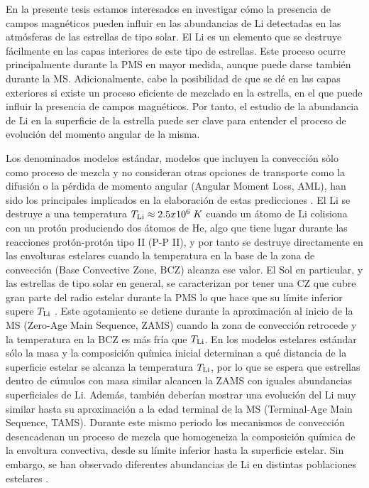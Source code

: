 En la presente tesis estamos interesados en investigar cómo la presencia de campos magnéticos pueden influir en las abundancias de Li detectadas en las atmósferas de las estrellas de tipo solar. El Li es un elemento que se destruye fácilmente en las capas interiores de este tipo de estrellas. Este proceso ocurre principalmente durante la PMS en mayor medida, aunque puede darse también durante la MS. Adicionalmente, cabe la posibilidad de que se dé en las capas exteriores si existe un proceso eficiente de mezclado en la estrella, en el que puede influir la presencia de campos magnéticos. Por tanto, el estudio de la abundancia de Li en la superficie de la estrella puede ser clave para entender el proceso de evolución del momento angular de la misma.\par


Los denominados modelos estándar, modelos que incluyen la convección sólo como proceso de mezcla y no consideran otras opciones de transporte como la difusión o la pérdida de momento angular (Angular Moment Loss, AML), han sido los principales implicados en la elaboración de estas predicciones \cite{Sestito2005}. El Li se destruye a una temperatura $T_{\mathrm{Li}} \approx 2.5 x 10^6\; K$ cuando un átomo de Li colisiona con un protón produciendo dos átomos de He, algo que tiene lugar durante las reacciones protón-protón tipo II (P-P II), y por tanto se destruye directamente en las envolturas estelares cuando la temperatura en la base de la zona de convección (Base Convective Zone, BCZ) alcanza ese valor. El Sol en particular, y las estrellas de tipo solar en general, se caracterizan por tener una CZ que cubre gran parte del radio estelar durante la PMS lo que hace que su límite inferior supere $T_{\mathrm{Li}}$ \cite{Iben1965}. Este agotamiento se detiene durante la aproximación al inicio de la MS (Zero-Age Main Sequence, ZAMS) cuando la zona de convección retrocede y la temperatura en la BCZ es más fría que $T_{\mathrm{Li}}$. En los modelos estelares estándar sólo la masa y la composición química inicial determinan a qué distancia de la superficie estelar se alcanza la temperatura $T_{\mathrm{Li}}$, por lo que se espera que estrellas dentro de cúmulos con masa similar alcancen la ZAMS con iguales abundancias superficiales de Li. Además, también deberían mostrar una evolución del Li muy similar hasta su aproximación a la edad terminal de la MS (Terminal-Age Main Sequence, TAMS). Durante este mismo periodo los mecanismos de convección desencadenan un proceso de mezcla que homogeneiza la composición química de la envoltura convectiva, desde su límite inferior hasta la superficie estelar. Sin embargo, se han observado diferentes abundancias de Li en distintas poblaciones estelares \cite[][y referencias en las mismas]{Somers2014}.\par

